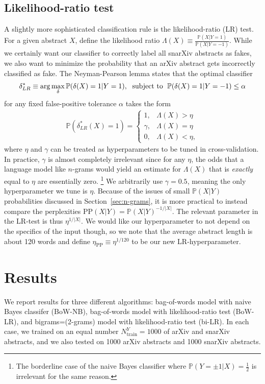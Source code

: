 \documentclass{article}
\renewcommand{\P}{\mathbb{P}}
\begin{document}
\subsection{Likelihood-ratio test}
A slightly more sophisticated classification rule is the likelihood-ratio (LR) test.
For a given abstract $X$, define the likelihood ratio $\Lambda(X)\equiv\frac{\P(X|Y=1)}{\P(X|Y=-1)}$.
While we certainly want our classifier to correctly label all snarXiv abstracts as fakes, we also want to minimize the probability that an arXiv abstract gets incorrectly classified as fake.
The Neyman-Pearson lemma states that the optimal classifier
\begin{align}
  \delta_{LR}^* \equiv \arg\max_\delta \P(\delta(X)=1|Y=1), \text{\; subject to \;} \P(\delta(X)=1|Y=-1)\leq \alpha
\end{align}
for any fixed false-positive tolerance $\alpha$ takes the form
\begin{align}
  \P\left(\delta_{LR}^*(X)=1\right) =
  \begin{cases}
    1,  & \Lambda(X) > \eta \\
    \gamma, & \Lambda(X) = \eta \\
    0,  & \Lambda(X) < \eta,
  \end{cases}
\end{align}
where $\eta$ and $\gamma$ can be treated as hyperparameters to be tuned in cross-validation.
In practice, $\gamma$ is almost completely irrelevant since for any $\eta$, the odds that a language model like $n$-grams would yield an estimate for $\Lambda(X)$ that is \textit{exactly} equal to $\eta$ are essentially zero.%
\footnote{The borderline case of the naive Bayes classifier where $\P(Y=\pm1|X)=\frac{1}{2}$ is irrelevant for the same reason.}
%
We arbitrarily use $\gamma=0.5$, meaning the only hyperparameter we tune is $\eta$.
Because of the issues of small $\P(X|Y)$ probabilities discussed in Section~\ref{sec:n-grams}, it is more practical to instead compare the perplexities $\text{PP}(X|Y)=\P(X|Y)^{-1/|X|}$.
The relevant parameter in the LR-test is thus $\eta^{1/|X|}$. We would like our hyperparameter to not depend on the specifics of the input though, so we note that the average abstract length is about 120 words and define $\eta_\text{PP}\equiv \eta^{1/120}$ to be our new LR-hyperparameter.







\section{Results}
We report results for three different algorithms: bag-of-words model with naive Bayes classifer (BoW-NB), bag-of-words model with likelihood-ratio test (BoW-LR), and bigrams=(2-grams) model with likelihood-ratio test (bi-LR).
In each case, we trained on an equal number $N_\text{train}^Y=1000$ of arXiv and snarXiv abstracts, and we also tested on 1000 arXiv abstracts and 1000 snarXiv abstracts.
%
%
\end{document}
